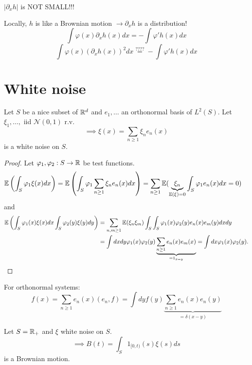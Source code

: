  $|\partial_x h|$ is NOT SMALL!!!

Locally, $h$ is like a Brownian motion $\to \partial_x h$ is a distribution!
\[\int \varphi(x)\partial_x h(x)dx=-\int \varphi' h(x)dx\]
\[\int \varphi(x)(\partial_x h(x))^2dx\stackrel{????}{=}-\int \varphi' h(x)dx\]

\section{White noise}

\begin{example}\label{ex:5.2}
    Let $S$ be a nice subset of $\mathbb{R}^d$ and $e_1,\dots$ an orthonormal basis of $L^2(S)$.
    Let $\xi_1,\dots,$ iid $\mathcal{N}(0,1)$ r.v. 
    \[\implies\xi(x)=\sum_{n\geq 1}\xi_n e_n(x)\]
    is a white noise on $S$.
\end{example}

\begin{proof}
    Let $\varphi_1,\varphi_2:S\to\mathbb{R}$ be test functions.
    \begin{align*}
        \mathbb{E}\left(\int_S \varphi_1\xi(x)dx\right)&=\mathbb{E}\left(\int_S \varphi_1\sum_{n\geq 1}\xi_ne_n(x)dx\right)=\sum_{n\geq 1}\mathbb{E}(\underbrace{\xi_n}_{\mathbb{E}(\xi)=0}\int_S\varphi_1 e_n(x)dx=0)
    \end{align*}
    and 
    \begin{align*}
        \mathbb{E}\left(\int_S\varphi_1(x) \xi(x)dx\int_S\varphi_2(y)\xi(y)dy\right)&=\sum_{n,m\geq 1}\mathbb{E}(\xi_n\xi_m)\int_S\int_S \varphi_1(x)\varphi_2(y)e_n(x)e_m(y)dxdy\\
        &=\int dx dy \varphi_1(x)\varphi_2(y)\underbrace{\sum_{n\geq 1}e_n(x)e_m(x)}_{=1_{x=y}}=\int dx\varphi_1(x)\varphi_2(y).
    \end{align*}
\end{proof}

\begin{aremark}
    For orthonormal systems:
    \[f(x)=\sum_{n\geq 1} e_n(x)(e_n,f)=\int dy f(y)\underbrace{\sum_{n\geq 1} e_n(x)e_n(y)}_{=\delta(x-y)}\]
\end{aremark}

\begin{example}\label{ex:5.3}
    Let $S=\mathbb{R}_+$ and $\xi$ white noise on $S$. 
    \[\implies B(t)=\int_S 1_{[0,t)}(s)\xi(s)ds\]
    is a Brownian motion.
\end{example}



